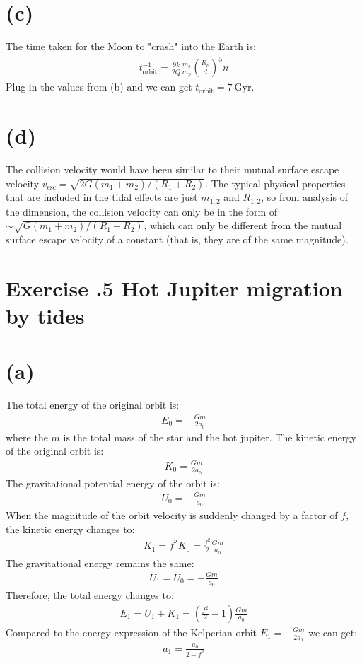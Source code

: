 \documentclass[a4paper,12pt]{article}
\begin{document}
\section*{(c)}
The time taken for the Moon to "crash" into the Earth is:
\begin{align*}
    t_{\text{orbit}}^{-1} = \frac{9k}{2Q} \frac{m_s}{m_p} (\frac{R_p}{d})^5 n
\end{align*}
Plug in the values from (b) and we can get $t_{\text{orbit}} = 7 \ \text{Gyr}$.

\section*{(d)}
The collision velocity would have been similar to their mutual surface escape velocity 
$v_{\text{esc}} = \sqrt{2G(m_1 + m_2)/(R_1 + R_2)}$. The typical physical properties 
that are included in the tidal effects are just $m_{1,2}$ and $R_{1,2}$, so from analysis of the dimension, 
the collision velocity can only be in the form of $\sim \sqrt{G(m_1 + m_2)/(R_1 + R_2)}$, which can only 
be different from the mutual surface escape velocity of a constant (that is, they are of the same magnitude).

\section*{\textbf{Exercise \uppercase\expandafter{}.5 Hot Jupiter migration by tides}}
\section*{(a)}
The total energy of the original orbit is:
\begin{align*}
    E_0 = -\frac{Gm}{2a_0}
\end{align*}
where the $m$ is the total mass of the star and the hot jupiter.
The kinetic energy of the original orbit is:
\begin{align*}
    K_0 = \frac{Gm}{2a_0}
\end{align*}
The gravitational potential energy of the orbit is:
\begin{align*}
    U_0 = - \frac{Gm}{a_0}
\end{align*}
When the magnitude of the orbit velocity is suddenly changed by a factor of $f$, the kinetic energy changes to:
\begin{align*}
    K_1 = f^2 K_0 = \frac{f^2}{2} \frac{Gm}{a_0}
\end{align*}
The gravitational energy remains the same:
\begin{align*}
    U_1 = U_0 = - \frac{Gm}{a_0}
\end{align*}
Therefore, the total energy changes to:
\begin{align*}
    E_1 = U_1 + K_1 = (\frac{f^2}{2} - 1) \frac{Gm}{a_0}
\end{align*}
Compared to the energy expression of the Kelperian orbit $E_1 = - \frac{Gm}{2a_1}$ we can get:
\begin{align*}
    a_1 = \frac{a_0}{2 - f^2}
\end{align*}
\end{document}
